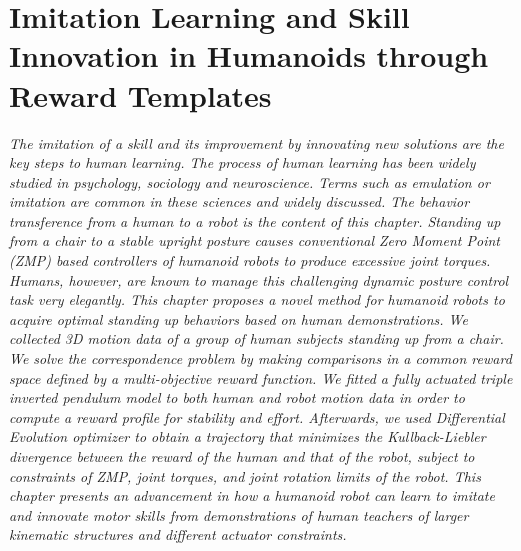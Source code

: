 \chapter{Imitation Learning and Skill Innovation in Humanoids through Reward Templates}\label{ch_imitation}
\textit{The imitation of a skill and its improvement by innovating new solutions are  the key steps to human learning. The process of human learning  has been widely studied in psychology, sociology and neuroscience. Terms such as emulation or imitation are common in these sciences and widely discussed. The behavior transference from a human to a robot is the content of this chapter. Standing up from a chair to a stable upright posture causes conventional Zero Moment Point (ZMP) based controllers of humanoid robots to produce excessive joint torques. Humans, however, are known to manage this challenging dynamic posture control task very elegantly. This chapter proposes a novel method for humanoid robots to acquire optimal standing up behaviors based on human demonstrations. We collected 3D motion data of a group of human subjects standing up from a chair.  We solve the correspondence problem by making comparisons in a common reward space defined by a multi-objective reward function. We fitted a fully actuated triple inverted pendulum model to both human and robot motion data in order to compute a reward profile for stability and effort.  Afterwards, we used Differential Evolution optimizer to obtain a trajectory that minimizes the Kullback-Liebler divergence between the reward of the human and that of the robot, subject to constraints of ZMP, joint torques, and joint rotation limits of the robot.
This chapter presents an advancement in how a humanoid robot can learn to imitate and innovate motor skills from demonstrations of human teachers of larger kinematic structures and different actuator constraints. %
}
\newpage
%
%
%
%
%
%

